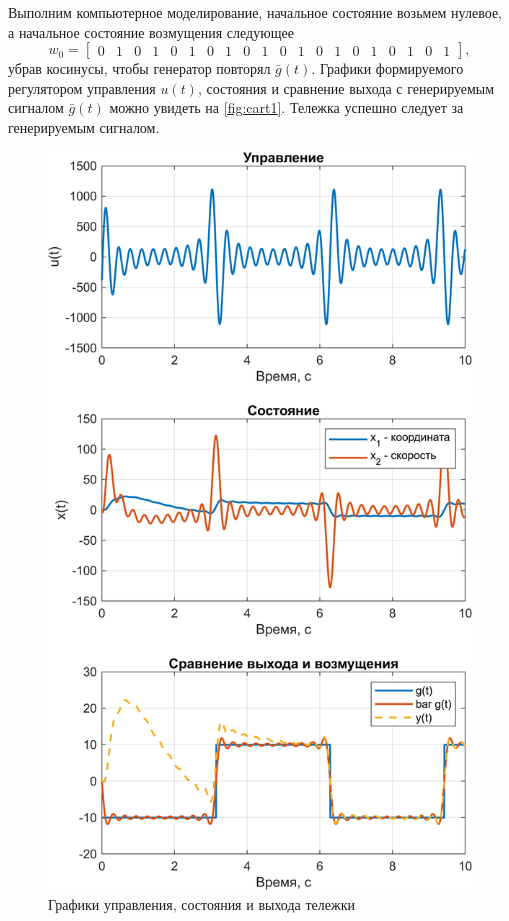 Выполним компьютерное моделирование, начальное состояние возьмем
нулевое, а начальное состояние возмущения следующее
\begin{equation*}
    w_0=\begin{bmatrix}
        0&1&0&1&0&1&0&1&0&1&0&1&0&1&0&1&0&1&0&1
    \end{bmatrix},
\end{equation*}
убрав косинусы, чтобы генератор повторял $\bar g(t)$.
Графики формируемого регулятором управления $u(t)$,
состояния и сравнение выхода с генерируемым сигналом $\bar g(t)$
можно увидеть на \autoref{fig:cart1}. Тележка успешно следует за
генерируемым сигналом.
\begin{figure}[H]
    \centering
    \includegraphics[width=0.8\linewidth]{figs/task4.png}
    \caption{Графики управления, состояния и выхода тележки}
    \label{fig:cart1}
\end{figure}



